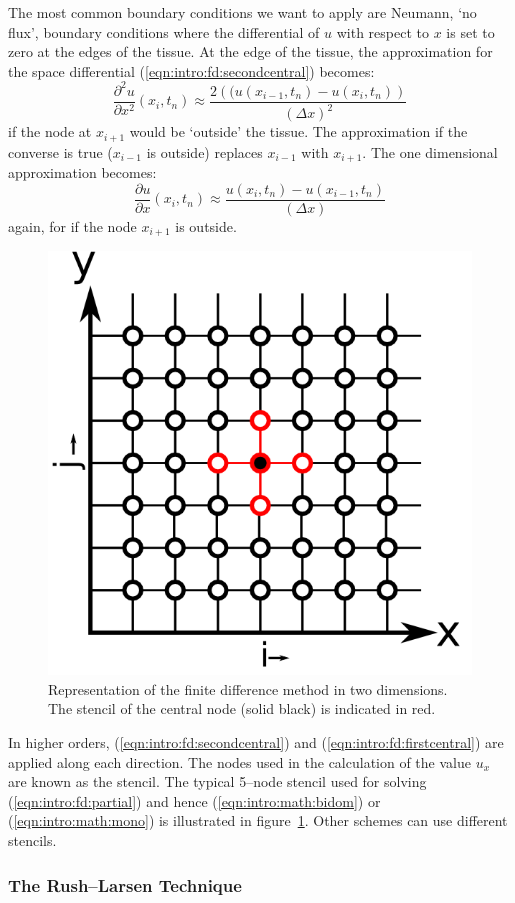The most common boundary conditions we want to apply are Neumann, `no flux',
boundary conditions where the differential of $u$ with respect to $x$ is set to
zero at the edges of the tissue.
At the edge of the tissue, the approximation for the space differential
(\ref{eqn:intro:fd:secondcentral}) becomes:
\begin{equation}
\label{eqn:intro:fd:secondcentralboundary}
\frac{\partial^2 u}{\partial x^2}\left(x_i, t_n\right) \approx \frac{2\left((u(x_{i-1},t_n) - u(x_{i},t_n) \right)  }{\left(\Delta x\right)^2}
\end{equation}
if the node at $x_{i+1}$ would be `outside' the tissue.
The approximation if the converse is true ($x_{i-1}$ is outside) replaces
$x_{i-1}$ with $x_{i+1}$.
The one dimensional approximation becomes:
\begin{equation}
\label{eqn:intro:fd:firstcentralboundary}
\frac{\partial u}{\partial x}\left(x_i, t_n\right) \approx \frac{u(x_{i},t_n) - u(x_{i-1},t_n) }{\left(\Delta x\right)}
\end{equation}
again, for if the node $x_{i+1}$ is outside.
\begin{figure}
\begin{center}
\includegraphics{figures/intro/stencil}
\end{center}
\caption[5--node Stencil for the Finite Difference Method]{
\label{fig:intro:math:stencil}
Representation of the finite difference method in two dimensions.
The stencil of the central node (solid black) is indicated in red.
}
\end{figure}
In higher orders, (\ref{eqn:intro:fd:secondcentral}) and
(\ref{eqn:intro:fd:firstcentral}) are applied along each direction.
The nodes used in the calculation of the value $u_x$ are known as the stencil.
The typical 5--node stencil used for solving (\ref{eqn:intro:fd:partial}) and
hence (\ref{eqn:intro:math:bidom}) or (\ref{eqn:intro:math:mono}) is illustrated
in figure~\ref{fig:intro:math:stencil}.
Other schemes can use different stencils.


\subsubsection{The Rush--Larsen Technique}


